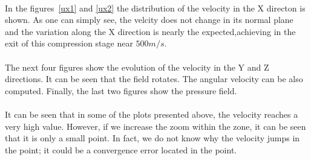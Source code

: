 \paragraph{}In the figures~\ref{ux1} and \ref{ux2} the distribution of the velocity in the X directon is shown. As one can simply see, the velcity does not change in its normal plane and the variation along the X direction is nearly the expected,achieving in the exit of this compression stage near $500 m/s$. 
\paragraph{}The next four figures show the evolution of the velocity in the Y and Z directions. It can be seen that the field rotates. The angular velocity can be also computed. Finally, the last two figures show the pressure field.

\paragraph{}It can be seen that in some of the plots presented above, the velocity reaches a very high value. However, if we increase the zoom within the zone, it can be seen that it is only a small point. In fact, we do not know why the velocity jumps in the point; it could be a convergence error located in the point.